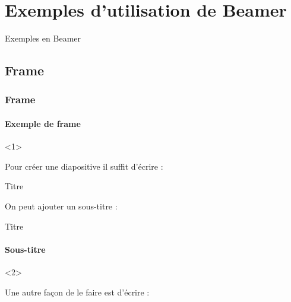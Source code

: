 \documentclass[french]{beamer}
\begin{document}
  \section{Exemples d'utilisation de Beamer}
  
   \begin{frame}[standout]
     Exemples en Beamer
   \end{frame}
  
  \subsection{Frame}
  
  \begin{slide}
    \frametitle{Frame}
    \framesubtitle{Exemple de frame}
    
    \begin{onlyenv}<1>
    \begin{block}{}
      Pour créer une diapositive il suffit d'écrire : 
      \begin{code}
        \begin{frame}{Titre}
        \end{frame}
      \end{code}
    \end{block}
    
    \begin{block}{}
      On peut ajouter un sous-titre :
      \begin{code}
        \begin{frame}{Titre}
          \framesubtitle{Sous-titre}
        \end{frame}
      \end{code}
    \end{block}
    \end{onlyenv}
    
    \begin{onlyenv}<2>
    \begin{block}{}
      Une autre façon de le faire est d'écrire :
      \begin{code}
      \end{code}
    \end{block}
    \end{onlyenv}
  \end{slide}
    
\end{document}
